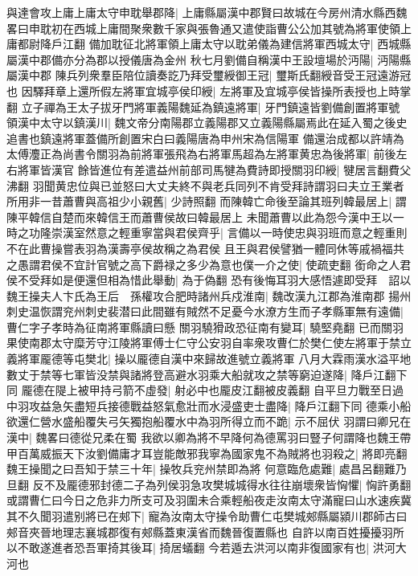 與達會攻上庸上庸太守申耽舉郡降|{
	上庸縣屬漢中郡賢曰故城在今房州清水縣西魏畧曰申耽初在西城上庸間聚衆數千家與張魯通又遣使詣曹公公加其號為將軍使領上庸都尉降戶江翻}
備加耽征北將軍領上庸太守以耽弟儀為建信將軍西城太守|{
	西城縣屬漢中郡備亦分為郡以授儀唐為金州}
秋七月劉備自稱漢中王設壇場於沔陽|{
	沔陽縣屬漢中郡}
陳兵列衆羣臣陪位讀奏訖乃拜受璽綬御王冠|{
	璽斯氏翻綬音受王冠遠游冠也}
因驛拜章上還所假左將軍宜城亭侯印綬|{
	左將軍及宜城亭侯皆操所表授也上時掌翻}
立子禪為王太子拔牙門將軍義陽魏延為鎮遠將軍|{
	牙門鎮遠皆劉備創置將軍號}
領漢中太守以鎮漢川|{
	魏文帝分南陽郡立義陽郡又立義陽縣屬焉此在延入蜀之後史追書也鎮遠將軍蓋備所創置宋白曰義陽唐為申州宋為信陽軍}
備還治成都以許靖為太傅灋正為尚書令關羽為前將軍張飛為右將軍馬超為左將軍黄忠為後將軍|{
	前後左右將軍皆漢官}
餘皆進位有差遣益州前部司馬犍為費詩即授關羽印綬|{
	犍居言翻費父沸翻}
羽聞黄忠位與已並怒曰大丈夫終不與老兵同列不肯受拜詩謂羽曰夫立王業者所用非一昔蕭曹與高祖少小親舊|{
	少詩照翻}
而陳韓亡命後至論其班列韓最居上|{
	謂陳平韓信自楚而來韓信王而蕭曹侯故曰韓最居上}
未聞蕭曹以此為怨今漢中王以一時之功隆崇漢室然意之輕重寧當與君侯齊乎|{
	言備以一時使忠與羽班而意之輕重則不在此曹操嘗表羽為漢壽亭侯故稱之為君侯}
且王與君侯譬猶一體同休等戚禍福共之愚謂君侯不宜計官號之高下爵禄之多少為意也僕一介之使|{
	使疏吏翻}
銜命之人君侯不受拜如是便還但相為惜此舉動|{
	為于偽翻}
恐有後悔耳羽大感悟遽即受拜　詔以魏王操夫人卞氏為王后　孫權攻合肥時諸州兵戍淮南|{
	魏改漢九江郡為淮南郡}
揚州刺史温恢謂兖州刺史裴潜曰此間雖有賊然不足憂今水潦方生而子孝縣軍無有遠備|{
	曹仁字子孝時為征南將軍縣讀曰懸}
關羽驍猾政恐征南有變耳|{
	驍堅堯翻}
已而關羽果使南郡太守糜芳守江陵將軍傅士仁守公安羽自率衆攻曹仁於樊仁使左將軍于禁立義將軍龎德等屯樊北|{
	操以龎德自漢中來歸故進號立義將軍}
八月大霖雨漢水溢平地數丈于禁等七軍皆没禁與諸將登高避水羽乘大船就攻之禁等窮迫遂降|{
	降戶江翻下同}
龎德在隄上被甲持弓箭不虛發|{
	射必中也龎皮江翻被皮義翻}
自平旦力戰至日過中羽攻益急矢盡短兵接德戰益怒氣愈壯而水浸盛吏士盡降|{
	降戶江翻下同}
德乘小船欲還仁營水盛船覆失弓矢獨抱船覆水中為羽所得立而不跪|{
	示不屈伏}
羽謂曰卿兄在漢中|{
	魏畧曰德從兄柔在蜀}
我欲以卿為將不早降何為德罵羽曰豎子何謂降也魏王帶甲百萬威振天下汝劉備庸才耳豈能敵邪我寧為國家鬼不為賊將也羽殺之|{
	將即亮翻}
魏王操聞之曰吾知于禁三十年|{
	操牧兵兖州禁即為將}
何意臨危處難|{
	處昌呂翻難乃旦翻}
反不及龎德邪封德二子為列侯羽急攻樊城城得水往往崩壞衆皆恟懼|{
	恟許勇翻}
或謂曹仁曰今日之危非力所支可及羽圍未合乘輕船夜走汝南太守滿寵曰山水速疾冀其不久聞羽遣别將已在郟下|{
	寵為汝南太守操令助曹仁屯樊城郟縣屬潁川郡師古曰郟音夾晉地理志襄城郡復有郟縣蓋東漢省而魏晉復置縣也}
自許以南百姓擾擾羽所以不敢遂進者恐吾軍掎其後耳|{
	掎居蟻翻}
今若遁去洪河以南非復國家有也|{
	洪河大河也}
